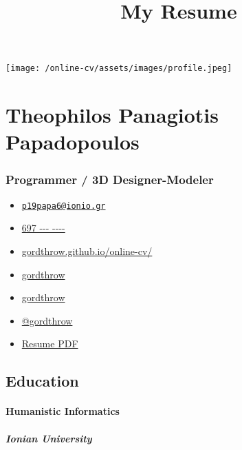 \documentclass[english,]{article}
\title{My Resume}
\date{}
\providecommand{\tightlist}{%
  \setlength{\itemsep}{0pt}\setlength{\parskip}{0pt}}
\let\oldparagraph\paragraph
\renewcommand{\paragraph}[1]{\oldparagraph{#1}\mbox{}}
\let\oldsubparagraph\subparagraph
\renewcommand{\subparagraph}[1]{\oldsubparagraph{#1}\mbox{}}
\begin{document}
\maketitle

\texttt{[image: /online-cv/assets/images/profile.jpeg]}

\hypertarget{theophilos-panagiotis-papadopoulos}{%
\section{Theophilos Panagiotis
Papadopoulos}\label{theophilos-panagiotis-papadopoulos}}

\hypertarget{programmer-3d-designer-modeler}{%
\subsubsection{Programmer / 3D
Designer-Modeler}\label{programmer-3d-designer-modeler}}

\begin{itemize}
\tightlist
\item
  \emph{} \href{mailto:p19papa6@ionio.gr}{\nolinkurl{p19papa6@ionio.gr}}
\item
  \emph{} \href{tel:697\%20---\%20----}{697 -\/-\/- -\/-\/-\/-}
\item
  \emph{}
  \href{http://gordthrow.github.io/online-cv/}{gordthrow.github.io/online-cv/}
\item
  \emph{} \href{https://linkedin.com/in/gordthrow}{gordthrow}
\item
  \emph{} \href{http://github.com/gordthrow}{gordthrow}
\item
  \emph{} \href{https://twitter.com/@gordthrow}{@gordthrow}
\item
  \emph{} \href{http://www.africau.edu/images/default/sample.pdf}{Resume
  PDF}
\end{itemize}

\hypertarget{education}{%
\subsection{Education}\label{education}}

\hypertarget{humanistic-informatics}{%
\paragraph{Humanistic Informatics}\label{humanistic-informatics}}

\hypertarget{ionian-university}{%
\subparagraph{Ionian University}\label{ionian-university}}
\end{document}
